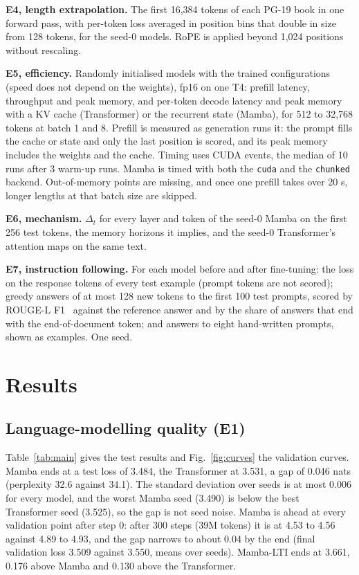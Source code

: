 \documentclass[conference]{IEEEtran}
\begin{document}
\textbf{E4, length extrapolation.} The first 16,384 tokens of each PG-19 book in one forward pass, with
per-token loss averaged in position bins that double in size from 128 tokens, for the seed-0 models.
RoPE is applied beyond 1,024 positions without rescaling.

\textbf{E5, efficiency.} Randomly initialised models with the trained configurations (speed does not
depend on the weights), fp16 on one T4: prefill latency, throughput and peak memory, and per-token
decode latency and peak memory with a KV cache (Transformer) or the recurrent state (Mamba), for 512 to
32,768 tokens at batch 1 and 8. Prefill is measured as generation runs it: the prompt fills the cache or
state and only the last position is scored, and its peak memory includes the weights and the cache. Timing uses CUDA events, the median of 10 runs after 3 warm-up runs. Mamba is timed with
both the \texttt{cuda} and the \texttt{chunked} backend. Out-of-memory points are missing, and once one
prefill takes over 20 s, longer lengths at that batch size are skipped.

\textbf{E6, mechanism.} $\Delta_t$ for every layer and token of the seed-0 Mamba on the first 256 test
tokens, the memory horizons it implies, and the seed-0 Transformer's attention maps on the same text.

\textbf{E7, instruction following.} For each model before and after fine-tuning: the loss on the
response tokens of every test example (prompt tokens are not scored); greedy answers of at most 128 new
tokens to the first 100 test prompts, scored by ROUGE-L F1~\cite{lin2004rouge} against the reference
answer and by the share of answers that end with the end-of-document token; and answers to eight
hand-written prompts, shown as examples. One seed.

\section{Results}

\subsection{Language-modelling quality (E1)}
Table~\ref{tab:main} gives the test results and Fig.~\ref{fig:curves} the validation curves. Mamba ends
at a test loss of 3.484, the Transformer at 3.531, a gap of 0.046 nats (perplexity 32.6 against 34.1).
The standard deviation over seeds is at most 0.006 for every model, and the worst Mamba seed (3.490) is
below the best Transformer seed (3.525), so the gap is not seed noise. Mamba is ahead at every
validation point after step 0: after 300 steps (39M tokens) it is at 4.53 to 4.56 against 4.89 to 4.93,
and the gap narrows to about 0.04 by the end (final validation loss 3.509 against 3.550, means over
seeds). Mamba-LTI ends at 3.661, 0.176 above Mamba and 0.130 above the
Transformer.
\end{document}
